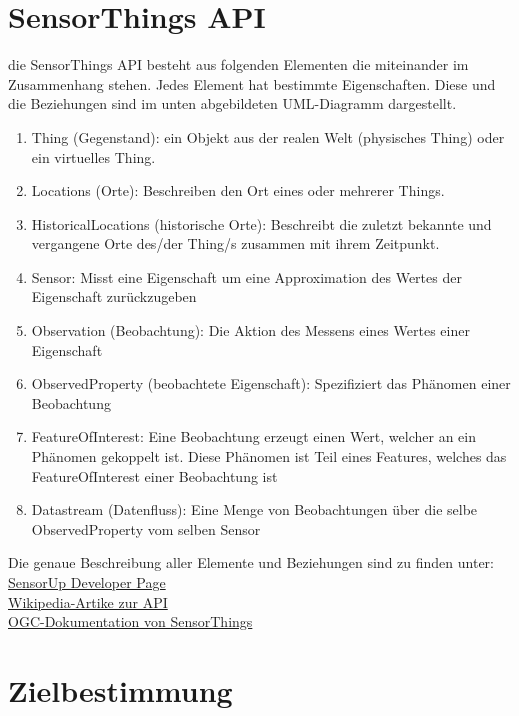 \documentclass[a4paper, 12 pt]{article}
\begin{document}
	\section{SensorThings API}

	die SensorThings API besteht aus folgenden Elementen die miteinander im Zusammenhang stehen. Jedes Element hat bestimmte Eigenschaften. Diese und die Beziehungen sind im unten abgebildeten UML-Diagramm dargestellt. \\
	\begin{enumerate}
	
	\item Thing (Gegenstand): ein Objekt aus der realen Welt (physisches Thing) oder ein virtuelles Thing.
	\item Locations (Orte): Beschreiben den Ort eines oder mehrerer Things.
	\item HistoricalLocations (historische Orte): Beschreibt die zuletzt bekannte und vergangene Orte des/der Thing/s zusammen mit ihrem Zeitpunkt.
	\item Sensor: Misst eine Eigenschaft um eine Approximation des Wertes der Eigenschaft zurückzugeben
	\item Observation (Beobachtung): Die Aktion des Messens eines Wertes einer Eigenschaft
	\item ObservedProperty (beobachtete Eigenschaft): Spezifiziert das Phänomen einer Beobachtung
	\item FeatureOfInterest: Eine Beobachtung erzeugt einen Wert, welcher an ein Phänomen gekoppelt ist. Diese Phänomen ist Teil eines Features, welches das FeatureOfInterest einer Beobachtung ist
	\item Datastream (Datenfluss): Eine Menge von Beobachtungen über die selbe ObservedProperty vom selben Sensor   
	\end{enumerate}
	Die genaue Beschreibung aller Elemente und Beziehungen sind zu finden unter: \\
	\href{http://developers.sensorup.com/docs/}{SensorUp Developer Page}\\
	\href{https://en.wikipedia.org/wiki/SensorThings_API}{Wikipedia-Artike zur API}\\
	\href{http://docs.opengeospatial.org/is/15-078r6/15-078r6.html}{OGC-Dokumentation von SensorThings}\\



\section{Zielbestimmung}
\end{document}
